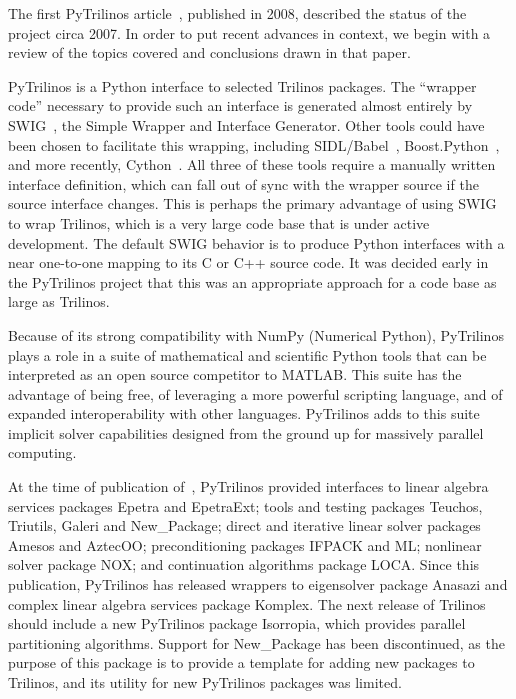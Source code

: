 \documentclass[11pt]{article}
\begin{document}
The first PyTrilinos article~\cite{PyTrilinos}, published in 2008, described the status of the project circa 2007.  In order to put recent advances in context, we begin with a review of the topics covered and conclusions drawn in that paper.

PyTrilinos is a Python interface to selected Trilinos packages.  The ``wrapper code'' necessary to provide such an interface is generated almost entirely by SWIG~\cite{SWIG_CXX_Python}, the Simple Wrapper and Interface Generator.  Other tools could have been chosen to facilitate this wrapping, including SIDL/Babel~\cite{Babel}, Boost.Python~\cite{BoostPython}, and more recently, Cython~\cite{Cython}.  All three of these tools require a manually written interface definition, which can fall out of sync with the wrapper source if the source interface changes.  This is perhaps the primary advantage of using SWIG to wrap Trilinos, which is a very large code base that is under active development.  The default SWIG behavior is to produce Python interfaces with a near one-to-one mapping to its C or C++ source code.  It was decided early in the PyTrilinos project that this was an appropriate approach for a code base as large as Trilinos.

Because of its strong compatibility with NumPy (Numerical Python), PyTrilinos plays a role in a suite of mathematical and scientific Python tools that can be interpreted as an open source competitor to MATLAB.  This suite has the advantage of being free, of leveraging a more powerful scripting language, and of expanded interoperability with other languages.  PyTrilinos adds to this suite implicit solver capabilities designed from the ground up for massively parallel computing.

At the time of publication of~\cite{PyTrilinos}, PyTrilinos provided interfaces to linear algebra services packages Epetra and EpetraExt; tools and testing packages Teuchos, Triutils, Galeri and New\_Package; direct and iterative linear solver packages Amesos and AztecOO; preconditioning packages IFPACK and ML; nonlinear solver package NOX; and continuation algorithms package LOCA.  Since this publication, PyTrilinos has released wrappers to eigensolver package Anasazi and complex linear algebra services package Komplex.  The next release of Trilinos should include a new PyTrilinos package Isorropia, which provides parallel partitioning algorithms.  Support for New\_Package has been discontinued, as the purpose of this package is to provide a template for adding new packages to Trilinos, and its utility for new PyTrilinos packages was limited.
\end{document}
